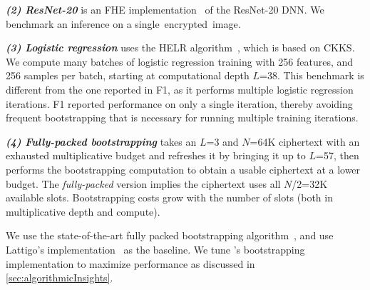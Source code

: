 \noindent \emph{\textbf{(2) ResNet-20}} is an FHE implementation~\cite{lee:2021:privacy} of 
the ResNet-20 DNN. 
We benchmark an inference on a single~encrypted~image.


\tblBenchmarksAndPerformanceBreakdown %

\noindent \emph{\textbf{(3) Logistic regression}}
uses the HELR algorithm~\cite{han:aaai19:logistic}, which is based on CKKS.
We compute many batches of logistic regression training with 256 features,
and 256 samples per batch,
starting at computational depth $L$=38. This benchmark is different from
the one reported in F1, as it performs multiple logistic regression iterations.
F1 reported performance on only a single iteration, thereby avoiding frequent
bootstrapping that is necessary for running multiple training iterations.


\noindent \emph{\textbf{(4) Fully-packed bootstrapping}}
takes an $L$=3 and $N$=64K ciphertext with an exhausted multiplicative budget and refreshes it
by bringing it up to $L$=57, then performs the bootstrapping computation
to obtain a usable ciphertext at a lower budget. The \emph{fully-packed}
version implies the ciphertext uses all $N$/2=32K available slots.
Bootstrapping costs grow with the number of slots (both in multiplicative depth and
compute).

We use the state-of-the-art fully packed bootstrapping algorithm~\cite{mouchet2020lattigo},
and use Lattigo's implementation~\cite{lattigo} as the baseline.
We tune \name's bootstrapping implementation
to maximize performance as discussed in \autoref{sec:algorithmicInsights}.


